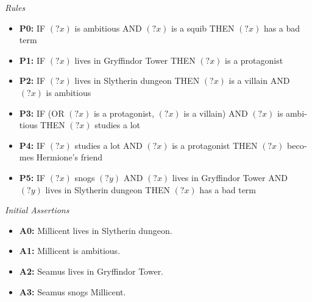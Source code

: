\documentclass[a4paper,10pt]{article}
\begin{document}
\begin{latin}
\emph{Rules}
\begin{itemize}
	\item \textbf{P0:} IF $(?x)$ is ambitious AND $(?x)$ is a squib THEN $(?x)$ has a bad term
	
	\item \textbf{P1:} IF $(?x)$ lives in Gryffindor Tower THEN $(?x)$ is a protagonist
	
	\item \textbf{P2:} IF $(?x)$ lives in Slytherin dungeon THEN $(?x)$ is a villain AND $(?x)$ is ambitious
	
	\item \textbf{P3:} IF (OR $(?x)$ is a protagonist, $(?x)$ is a villain) AND $(?x)$ is ambitious THEN $(?x)$ studies a lot
	
	\item \textbf{P4:} IF $(?x)$ studies a lot AND $(?x)$ is a protagonist THEN $(?x)$ becomes Hermione's friend
	
	\item \textbf{P5:} IF $(?x)$ snogs $(?y)$ AND $(?x)$ lives in Gryffindor Tower AND $(?y)$ lives in Slytherin dungeon THEN $(?x)$ has a bad term
\end{itemize}
\end{latin}

\begin{latin}
\emph{Initial Assertions}
\begin{itemize}
	\item \textbf{A0:} Millicent lives in Slytherin dungeon.
	\item \textbf{A1:} Millicent is ambitious.
	\item \textbf{A2:} Seamus lives in Gryffindor Tower.
	\item \textbf{A3:} Seamus snogs Millicent.
\end{itemize}
\end{latin}
\end{document}
